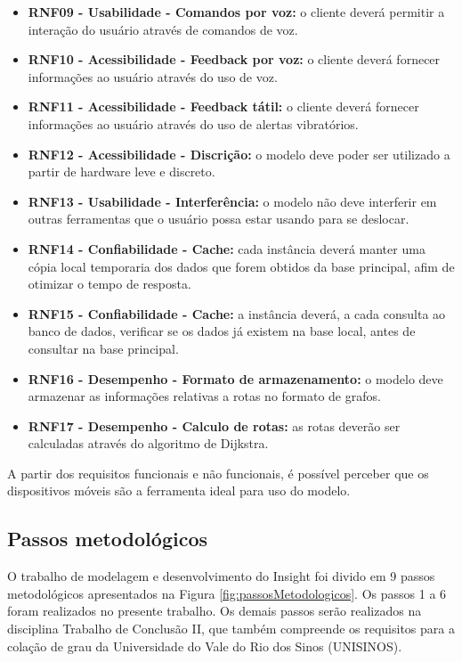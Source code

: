 \documentclass[english,brazilian]{UNISINOSmonografia}
\begin{document}
\begin{itemize}
	\item \textbf{RNF09 - Usabilidade - Comandos por voz:} o cliente deverá permitir a interação do usuário através de comandos de voz.

	\item \textbf{RNF10 - Acessibilidade - Feedback por voz:} o cliente deverá fornecer informações ao usuário através do uso de voz.

	\item \textbf{RNF11 - Acessibilidade - Feedback tátil:} o cliente deverá fornecer informações ao usuário através do uso de alertas vibratórios.

	\item \textbf{RNF12 - Acessibilidade - Discrição:} o modelo deve poder ser utilizado a partir de hardware leve e discreto.

	\item \textbf{RNF13 - Usabilidade - Interferência:} o modelo não deve interferir em outras ferramentas que o usuário possa estar usando para se deslocar.

	\item \textbf{RNF14 - Confiabilidade - Cache:} cada instância deverá manter uma cópia local temporaria dos dados que forem obtidos da base principal, afim de otimizar o tempo de resposta.

	\item \textbf{RNF15 - Confiabilidade - Cache:} a instância deverá, a cada consulta ao banco de dados, verificar se os dados já existem na base local, antes de consultar na base principal.

	\item \textbf{RNF16 - Desempenho - Formato de armazenamento:} o modelo deve armazenar as informações relativas a rotas no formato de grafos.

	\item \textbf{RNF17 - Desempenho - Calculo de rotas:} as rotas deverão ser calculadas através do algoritmo de Dijkstra.

\end{itemize}

A partir dos requisitos funcionais e não funcionais, é possível perceber que os dispositivos móveis são a ferramenta ideal para uso do modelo.

\subsection{Passos metodológicos}

O trabalho de modelagem e desenvolvimento do Insight foi divido em 9 passos metodológicos apresentados na Figura \ref{fig:passosMetodologicos}. Os passos 1 a 6 foram realizados no presente trabalho. Os demais passos serão realizados na disciplina Trabalho de Conclusão II, que também compreende os requisitos para a colação de grau da Universidade do Vale do Rio dos Sinos (UNISINOS).
\end{document}
